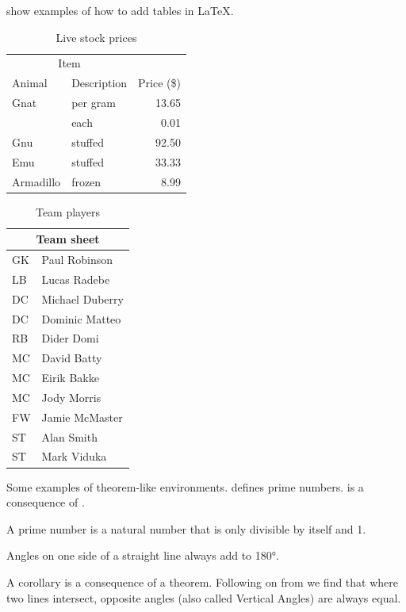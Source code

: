  show examples of how to add tables in \LaTeX.

\begin{table}[hbt]
  \centering
  \caption{Live stock prices}
  \label{tab:prices}
  \begin{tabular}{llr}  
    \toprule
    \multicolumn{2}{c}{Item} \\
    \cmidrule(r){1-2}
    Animal    & Description & Price (\$) \\
    \midrule
    Gnat      & per gram    & 13.65      \\
              &    each     & 0.01       \\
    Gnu       & stuffed     & 92.50      \\
    Emu       & stuffed     & 33.33      \\
    Armadillo & frozen      & 8.99       \\
    \bottomrule
  \end{tabular}
\end{table}


\begin{table}[hbt]
  \centering
  \caption{Team players}
  \label{tab:team-sheet}
  \begin{tabular}{ll}
    \toprule
    \multicolumn{2}{c}{Team sheet} \\
    \midrule
    GK & Paul Robinson \\
    LB & Lucas Radebe \\
    DC & Michael Duberry \\
    DC & Dominic Matteo \\
    RB & Dider Domi \\
    MC & David Batty \\
    MC & Eirik Bakke \\
    MC & Jody Morris \\
    FW & Jamie McMaster \\
    ST & Alan Smith \\
    ST & Mark Viduka \\
    \bottomrule
  \end{tabular}
\end{table}




Some examples of theorem-like environments.  defines prime numbers.  is a consequence of .
%
\begin{definition}\label{def:prime}
  A prime number is a natural number that is only divisible by itself and 1.
\end{definition}
%
\begin{theorem}\label{thm:one-side-line}
  Angles on one side of a straight line always add to \ang{180}.
\end{theorem}
%
\begin{corollary}\label{cor:vertical-angles}
  A corollary is a consequence of a theorem. 
  Following on from  we find that where two lines intersect, opposite angles (also called Vertical Angles) are always equal.
\end{corollary}




